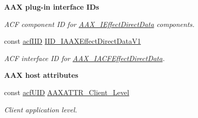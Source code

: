\begin{Indent}{\bf A\+A\+X plug-\/in interface I\+Ds}
\begin{DoxyCompactItemize}
\begin{DoxyCompactList}\small\item\em A\+C\+F component I\+D for \hyperlink{a00097}{A\+A\+X\+\_\+\+I\+Effect\+Direct\+Data} components. \end{DoxyCompactList}\item 
const \hyperlink{a00150_a59df0b41744eee7a066787aaedf97f67}{acf\+I\+I\+D} \hyperlink{a00299_a656fd18bfe63b2578f8ea56f34616613}{I\+I\+D\+\_\+\+I\+A\+A\+X\+Effect\+Direct\+Data\+V1}
\begin{DoxyCompactList}\small\item\em A\+C\+F interface I\+D for \hyperlink{a00059}{A\+A\+X\+\_\+\+I\+A\+C\+F\+Effect\+Direct\+Data}. \end{DoxyCompactList}\end{DoxyCompactItemize}
\end{Indent}
\begin{Indent}{\bf A\+A\+X host attributes}\par
\begin{DoxyCompactItemize}
\item 
const \hyperlink{a00150_ab19414382287ff80930c48a196145214}{acf\+U\+I\+D} \hyperlink{a00299_a1bbc82d62cf23079e92826874381a891}{A\+A\+X\+A\+T\+T\+R\+\_\+\+Client\+\_\+\+Level}
\begin{DoxyCompactList}\small\item\em Client application level. \end{DoxyCompactList}\end{DoxyCompactItemize}
\end{Indent}
